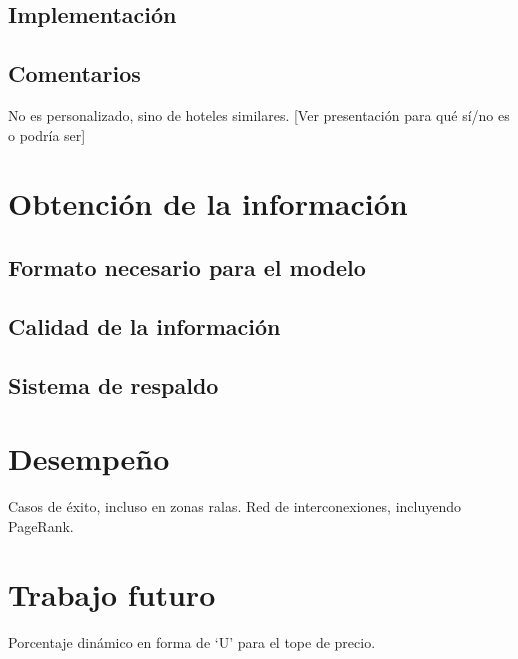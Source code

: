 \documentclass[12pt]{report}
\begin{document}
\section{Implementación}
\section{Comentarios}
No es personalizado, sino de hoteles similares.
[Ver presentación para qué sí/no es o podría ser]

\chapter{Obtención de la información}
\section{Formato necesario para el modelo}
\section{Calidad de la información}
\section{Sistema de respaldo}

\chapter{Desempeño}
Casos de éxito, incluso en zonas ralas.
Red de interconexiones, incluyendo PageRank.

\chapter{Trabajo futuro}
Porcentaje dinámico en forma de `U' para el tope de precio.

 
 
\end{document}
